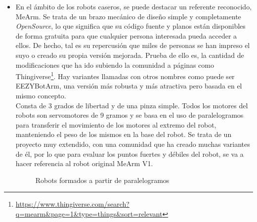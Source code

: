\begin{itemize}
    \item En el ámbito de los robots caseros, se puede destacar un referente reconocido, MeArm. Se trata de un 
    brazo mecánico de diseño simple y completamente \textit{OpenSource}, lo que significa que su código fuente y planos están disponibles 
    de forma gratuita para que cualquier persona interesada pueda acceder a ellos. De hecho, tal es su repercusión que miles de personas 
    se han impreso el suyo o creado su propia versión mejorada. Prueba de ello es, la cantidad de modificaciones que ha ido subiendo la comunidad a 
    páginas como Thingiverse\footnote{\url{https://www.thingiverse.com/search?q=mearm&page=1&type=things&sort=relevant}}. Hay variantes llamadas 
    con otros nombres como puede ser EEZYBotArm, una versión más robusta y más atractiva pero basada en el mismo concepto. \\
    Consta de 3 grados de libertad y de una pinza simple. Todos los motores del robots son servomotores de 9 gramos y se basa en el uso de 
    paralelogramos para transferir el movimiento de los motores al extremo del robot, manteniendo el peso de los mismos en la base del robot. 
    Se trata de un proyecto muy extendido, con una comunidad que ha creado muchas variantes de él, por lo que para evaluar los puntos fuertes y 
    débiles del robot, se va a hacer referencia al robot original MeArm V1.
    \begin{figure} [h!]
        \centering    
        \hspace{3cm}
        \caption{Robots formados a partir de paralelogramos}
    \end{figure}

\end{itemize}
